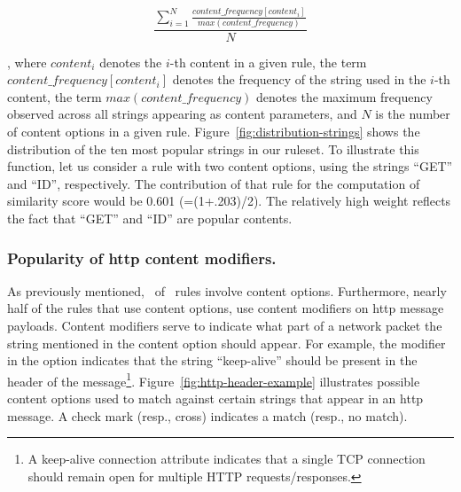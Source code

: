 \documentclass[sigconf,review, anonymous]{acmart}
\begin{document}
\vspace{-2.5ex}
\[\frac{\sum_{i=1}^{N}\frac{\mathit{content\_frequency[content_i]}}{\mathit{max(content\_frequency)}}}{N}\]
\vspace{-2.5ex}

\noindent
, where $\mathit{content_i}$ denotes the $i$-th content in a given
rule, the term $\mathit{content\_frequency[\mathit{content_i}]}$
denotes the frequency of the string used in the $i$-th content, the
term $\mathit{max(content\_frequency)}$ denotes the maximum frequency
observed across all strings appearing as content parameters, and $N$
is the number of content options in a given
rule. Figure~\ref{fig:distribution-strings} shows the distribution of
the ten most popular strings in our ruleset. To illustrate this
function, let us consider a rule with two content options, using the
strings ``GET'' and ``ID'', respectively. The contribution of that
rule for the computation of similarity score would be 0.601
(=(1+.203)/2). The relatively high weight reflects the fact that
``GET'' and ``ID'' are popular contents.

\subsubsection{Popularity of http content modifiers.} As previously
mentioned, \percRulesWithContent\ of \suri\ rules involve content
options. Furthermore, nearly half of the rules that use content
options, use content modifiers on http message payloads. Content
modifiers serve to indicate what part of a network packet the string
mentioned in the content option should appear. For example, the
modifier  in the option  indicates that the string
``keep-alive'' should be present in the header of the
message\footnote{A keep-alive connection attribute indicates that a
  single TCP connection should remain open for multiple HTTP
  requests/responses.}.  Figure~\ref{fig:http-header-example}
illustrates possible content options used to match against certain
strings that appear in an http message. A check mark (resp., cross)
indicates a match (resp., no match).
\end{document}
